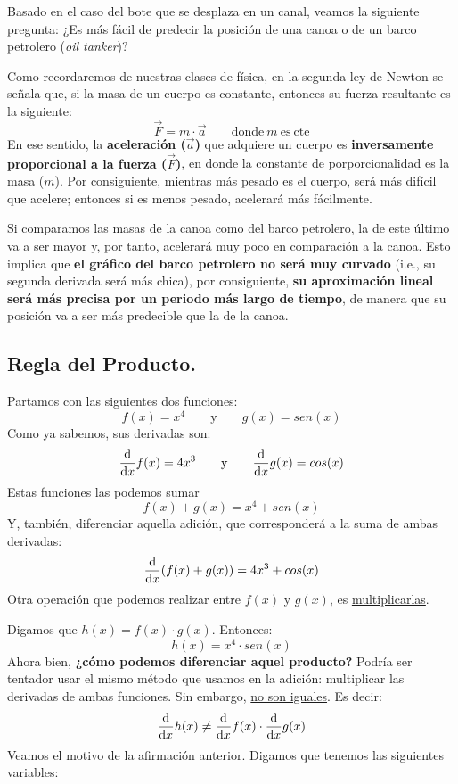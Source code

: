 \documentclass[12pt]{article}
\begin{document}
Basado en el caso del bote que se desplaza en un canal, veamos la siguiente pregunta: ¿Es más fácil de predecir la posición de una canoa o de un barco petrolero (\textit{oil tanker})?

Como recordaremos de nuestras clases de física, en la segunda ley de Newton se señala que, si la masa de un cuerpo es constante, entonces su fuerza resultante es la siguiente:
\[\vec{F} = m \cdot \vec{a} \qquad \mathrm{donde} \ m \ \mathrm{es \ cte}\]
En ese sentido, la \textbf{aceleración ($\vec{a}$)} que adquiere un cuerpo es \textbf{inversamente proporcional a la fuerza ($\vec{F}$)}, en donde la constante de porporcionalidad es la masa ($m$). Por consiguiente, mientras más pesado es el cuerpo, será más difícil que acelere; entonces si es menos pesado, acelerará más fácilmente.

Si comparamos las masas de la canoa como del barco petrolero, la de este último va a ser mayor y, por tanto, acelerará muy poco en comparación a la canoa. Esto implica que \textbf{el gráfico del barco petrolero no será muy curvado} (i.e., su segunda derivada será más chica), por consiguiente, \textbf{su aproximación lineal será más precisa por un periodo más largo de tiempo}, de manera que su posición va a ser más predecible que la de la canoa.




\subsection{Regla del Producto.}

Partamos con las siguientes dos funciones:
\[f(x) = x^{4} \qquad \mathrm{y} \qquad g(x) = sen(x)\]
Como ya sabemos, sus derivadas son:
\[\diff*{f(x)}x = 4x^{3} \qquad \mathrm{y} \qquad \diff*{g(x)}x = cos(x)\]
Estas funciones las podemos sumar
\[f(x) + g(x) = x^{4} + sen(x)\]
Y, también, diferenciar aquella adición, que corresponderá a la suma de ambas derivadas:
\[\diff*{(f(x) + g(x))}x = 4x^{3} + cos(x)\]
Otra operación que podemos realizar entre $f(x)$ y $g(x)$, es \underline{multiplicarlas}.

Digamos que $h(x) = f(x) \cdot g(x)$. Entonces:
\[h(x) = x^{4} \cdot sen(x)\]
Ahora bien, \textbf{¿cómo podemos diferenciar aquel producto?} Podría ser tentador usar el mismo método que usamos en la adición: multiplicar las derivadas de ambas funciones. Sin embargo, \underline{no son iguales}. Es decir:
\[\diff*{h(x)}x \neq \diff*{f(x)}x \cdot \diff*{g(x)}x\]
Veamos el motivo de la afirmación anterior. Digamos que tenemos las siguientes variables:
\end{document}
